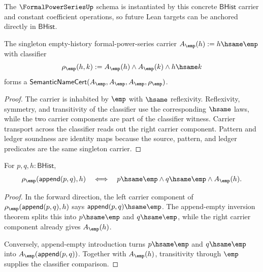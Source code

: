 The $\FormalPowerSeriesUp$ schema is instantiated by this concrete
$\mathsf{BHist}$ carrier and constant coefficient operations, so future Lean
targets can be anchored directly in $\mathsf{BHist}$.

\begin{theorem}
\label{thm:fps-singleton-empty-history-semantic-namecert}
The singleton empty-history formal-power-series carrier
$A_{\emp}(h):=h\hsame\emp$ with classifier
$$
\rho_{\emp}(h,k):=A_{\emp}(h)\land A_{\emp}(k)\land h\hsame k
$$
forms a
$\mathsf{SemanticNameCert}(A_{\emp},A_{\emp},A_{\emp},\rho_{\emp})$.
\end{theorem}
\begin{proof}
The carrier is inhabited by $\emp$ with $\hsame$ reflexivity. Reflexivity,
symmetry, and transitivity of the classifier use the corresponding $\hsame$
laws, while the two carrier components are part of the classifier witness.
Carrier transport across the classifier reads out the right carrier component.
Pattern and ledger soundness are identity maps because the source, pattern, and
ledger predicates are the same singleton carrier.
\end{proof}

\begin{theorem}
\label{thm:fps-singleton-classifier-append-split-empty}
For $p,q,h:\mathsf{BHist}$,
$$
\rho_{\emp}(\mathsf{append}(p,q),h)
\quad\Longleftrightarrow\quad
p\hsame\emp\land q\hsame\emp\land A_{\emp}(h).
$$
\end{theorem}
\begin{proof}
In the forward direction, the left carrier component of
$\rho_{\emp}(\mathsf{append}(p,q),h)$ says
$\mathsf{append}(p,q)\hsame\emp$. The append-empty inversion theorem splits
this into $p\hsame\emp$ and $q\hsame\emp$, while the right carrier component
already gives $A_{\emp}(h)$.

Conversely, append-empty introduction turns $p\hsame\emp$ and $q\hsame\emp$
into $A_{\emp}(\mathsf{append}(p,q))$. Together with $A_{\emp}(h)$, transitivity
through $\emp$ supplies the classifier comparison.
\end{proof}

